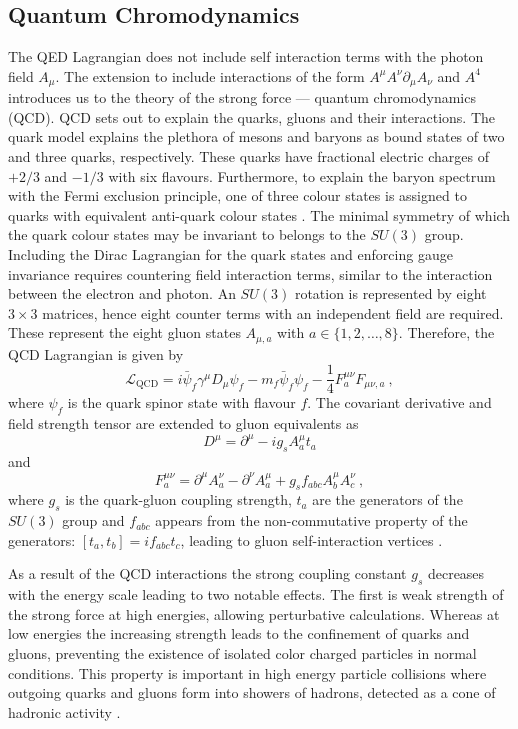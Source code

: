 \subsection{Quantum Chromodynamics}

The QED Lagrangian does not include self interaction terms with the photon
field $A_\mu$. The extension to include interactions of the form
$A^{\mu}A^\nu\partial_\mu A_\nu$ and $A^4$ introduces us to the theory of the
strong force --- quantum chromodynamics (QCD). QCD sets out to explain the
quarks, gluons and their interactions. The quark model explains the plethora
of mesons and baryons as bound states of two and three quarks, respectively.
These quarks have fractional electric charges of $+2/3$ and $-1/3$ with six
flavours. Furthermore, to explain the baryon spectrum with the Fermi exclusion
principle, one of three colour states is assigned to quarks with equivalent
anti-quark colour states \cite{Peskin:1995ev}. The minimal symmetry of which
the quark colour states may be invariant to belongs to the $SU(3)$ group.
Including the Dirac Lagrangian for the quark states and enforcing gauge
invariance requires countering field interaction terms, similar to the interaction between the electron and photon. An $SU(3)$
rotation is represented by eight $3\times 3$ matrices, hence eight counter
terms with an independent field are required. These represent the eight gluon
states $A_{\mu,a}$ with $a\in\{1,2,\ldots,8\}$. Therefore, the QCD Lagrangian
is given by
%
\begin{equation}
    \mathcal{L}_{\mathrm{QCD}} = i\bar{\psi}_f\gamma^{\mu}D_\mu\psi_f - m_f\bar{\psi}_f\psi_f - \frac{1}{4}F^{\mu\nu}_a F_{\mu\nu,a}\ ,
\end{equation}
%
where $\psi_f$ is the quark spinor state with flavour $f$. The covariant
derivative and field strength tensor are extended to gluon equivalents as
%
\begin{equation}
    D^{\mu} = \partial^\mu - i g_{s}A^\mu_a t_a
\end{equation}
%
and
%
\begin{equation}
    F^{\mu\nu}_a = \partial^\mu A^\nu_a - \partial^\nu A^\mu_a + g_{s} f_{abc}A^\mu_b A^\nu_c\ ,
\end{equation}
%
where $g_{s}$ is the quark-gluon coupling strength, $t_a$ are the generators
of the $SU(3)$ group and $f_{abc}$ appears from the non-commutative property
of the generators: $[t_a,t_b]=if_{abc}t_c$, leading to gluon self-interaction
vertices \cite{Peskin:1995ev}.

As a result of the QCD interactions the strong coupling constant $g_s$
decreases with the energy scale leading to two notable effects. The first is
weak strength of the strong force at high energies, allowing perturbative
calculations. Whereas at low energies the increasing strength leads to the
confinement of quarks and gluons, preventing the existence of isolated color
charged particles in normal conditions. This property is important in high
energy particle collisions where outgoing quarks and gluons form into showers
of hadrons, detected as a cone of hadronic activity \cite{Peskin:1995ev}.


